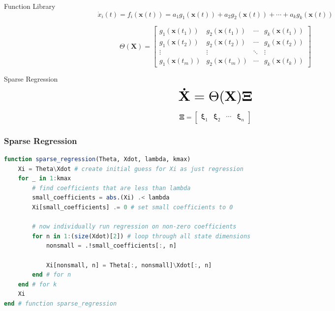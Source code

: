 \documentclass[aspectratio=169]{beamer}
\begin{document}
\begin{frame}{Function Library}
	\[ \dot x_i(t) = f_i(\mathbf x(t)) = a_1g_1(\mathbf x(t)) + a_2 g_2(\mathbf x(t)) + \cdots + a_k g_k(\mathbf x(t)) \]
	\pause
	\vspace{1.5em}

	\[ \Theta(\mathbf X) = \begin{bmatrix}
		g_1(\mathbf x(t_1)) & g_2(\mathbf x(t_1)) & \cdots & g_k(\mathbf x(t_1)) \\
		g_1(\mathbf x(t_2)) & g_2(\mathbf x(t_2)) & \cdots & g_k(\mathbf x(t_2)) \\ 
		\vdots & \vdots & \ddots & \vdots \\ 
		g_1(\mathbf x(t_m)) & g_2(\mathbf x(t_m)) & \cdots & g_k(\mathbf x(t_k))
	\end{bmatrix} \]
\end{frame}

\begin{frame}{Sparse Regression}
	\[ \scalebox{2}{$\mathbf {\dot X} = \Theta(\mathbf X)\mathbf \Xi$} \]

	\vspace{2em}

	\[ \mathbf \Xi = \begin{bmatrix} \boldsymbol \xi_1 & \boldsymbol \xi_2 & \cdots & \boldsymbol \xi_n \end{bmatrix}  \]
\end{frame}

\begin{frame}[fragile]
	\frametitle{Sparse Regression}

	\begin{lstlisting}[language = Julia]
function sparse_regression(Theta, Xdot, lambda, kmax) 
    Xi = Theta\Xdot # create initial guess for Xi as just regression
    for _ in 1:kmax 
        # find coefficients that are less than lambda
        small_coefficients = abs.(Xi) .< lambda
        Xi[small_coefficients] .= 0 # set small coefficients to 0 

        # now individually run regression on non-zero coefficients
        for n in 1:(size(Xdot)[2]) # loop through all state dimensions 
            nonsmall = .!small_coefficients[:, n]
            
            Xi[nonsmall, n] = Theta[:, nonsmall]\Xdot[:, n]
        end # for n
    end # for k 
    Xi
end # function sparse_regression
	\end{lstlisting}
\end{frame}
\end{document}
